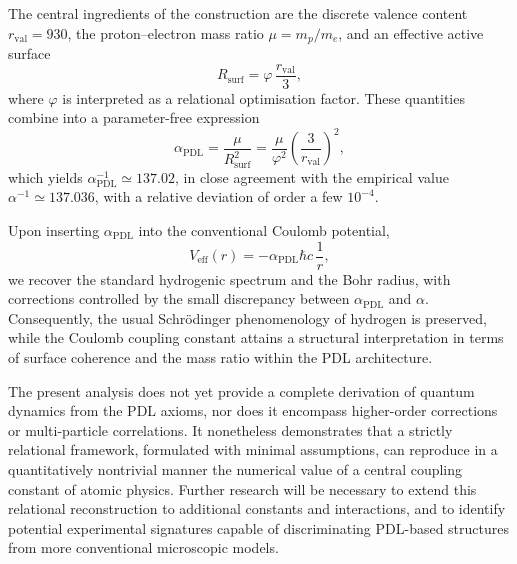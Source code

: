 \documentclass[12pt,a4paper]{article}
\begin{document}
The central ingredients of the construction are the discrete valence content \(r_{\text{val}}=930\), the proton–electron mass ratio \(\mu=m_p/m_e\), and an effective active surface
\[
  R_{\text{surf}} = \varphi\,\frac{r_{\text{val}}}{3},
\]
where \(\varphi\) is interpreted as a relational optimisation factor.
These quantities combine into a parameter-free expression
\[
  \alpha_{\text{PDL}}
  =
  \frac{\mu}{R_{\text{surf}}^2}
  =
  \frac{\mu}{\varphi^2}\left(\frac{3}{r_{\text{val}}}\right)^2,
\]
which yields \(\alpha_{\text{PDL}}^{-1}\simeq 137.02\), in close agreement with the empirical value \(\alpha^{-1}\simeq 137.036\), with a relative deviation of order a few \(10^{-4}\).\cite{Laubscher2026PDL_English,Laubscher2026LDP_French}

Upon inserting \(\alpha_{\text{PDL}}\) into the conventional Coulomb potential,
\[
  V_{\text{eff}}(r) = -\alpha_{\text{PDL}}\hbar c\,\frac{1}{r},
\]
we recover the standard hydrogenic spectrum and the Bohr radius, with corrections controlled by the small discrepancy between \(\alpha_{\text{PDL}}\) and \(\alpha\).
Consequently, the usual Schr\"odinger phenomenology of hydrogen is preserved, while the Coulomb coupling constant attains a structural interpretation in terms of surface coherence and the mass ratio within the PDL architecture.\cite{Laubscher2026PDL_English,Laubscher2026LDP_French}

The present analysis does not yet provide a complete derivation of quantum dynamics from the PDL axioms, nor does it encompass higher-order corrections or multi-particle correlations.
It nonetheless demonstrates that a strictly relational framework, formulated with minimal assumptions, can reproduce in a quantitatively nontrivial manner the numerical value of a central coupling constant of atomic physics.
Further research will be necessary to extend this relational reconstruction to additional constants and interactions, and to identify potential experimental signatures capable of discriminating PDL-based structures from more conventional microscopic models.\cite{Laubscher2026IntroPDL,Laubscher2026PDL_English}


\end{document}

